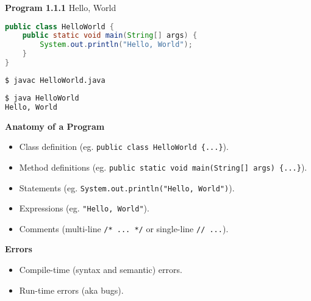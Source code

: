 \documentclass[8pt,a4paper,compress]{beamer}
\begin{document}
\begin{frame}[fragile]
\pause

\textbf{Program 1.1.1} Hello, World

\begin{lstlisting}[language=Java]
public class HelloWorld {
    public static void main(String[] args) {
        System.out.println("Hello, World");
    }
}
\end{lstlisting}

\pause
\begin{lstlisting}[language=bash]
$ javac HelloWorld.java
\end{lstlisting}

\pause

\begin{lstlisting}[language=bash]
$ java HelloWorld
Hello, World
\end{lstlisting}

\pause
\smallskip

\textbf{Anatomy of a Program}
\begin{itemize}
\item Class definition (eg. \texttt{public class HelloWorld \{...\}}).
\item Method definitions (eg. \texttt{public static void main(String[] args)  \{...\}}).
\item Statements (eg. \texttt{System.out.println("Hello, World")}).
\item Expressions (eg. \texttt{"Hello, World"}).
\item Comments (multi-line \texttt{/* ... */} or single-line \texttt{// ...}).
\end{itemize}

\pause
\smallskip

\textbf{Errors}
\begin{itemize}
\item Compile-time (syntax and semantic) errors.
\item Run-time errors (aka bugs).
\end{itemize}
\end{frame}
\end{document}
